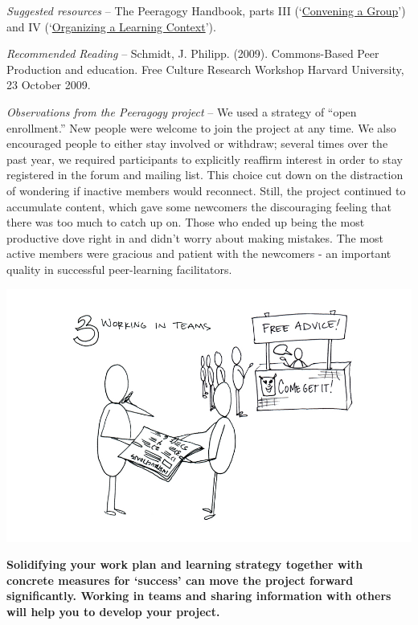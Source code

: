 \emph{Suggested resources} -- The Peeragogy Handbook, parts III
(`\href{http://peeragogy.org/convening-a-group/}{Convening a Group}')
and IV
(`\href{http://peeragogy.org/organizing-a-learning-context/}{Organizing
a Learning Context}').

\emph{Recommended Reading} -- Schmidt, J. Philipp. (2009). Commons-Based
Peer Production and education. Free Culture Research Workshop Harvard
University, 23 October 2009.

\emph{Observations from the Peeragogy project} -- We used a strategy of
``open enrollment.'' New people were welcome to join the project at any
time. We also encouraged people to either stay involved or withdraw;
several times over the past year, we required participants to explicitly
reaffirm interest in order to stay registered in the forum and mailing
list. This choice cut down on the distraction of wondering if inactive
members would reconnect. Still, the project continued to accumulate
content, which gave some newcomers the discouraging feeling that there
was too much to catch up on. Those who ended up being the most
productive dove right in and didn't worry about making mistakes. The
most active members were gracious and patient with the newcomers - an
important quality in successful peer-learning facilitators.

\begin{center}
\includegraphics{../pictures/OpenBook-2-3.jpg}
\end{center}

\textbf{Solidifying your work plan and learning strategy together with
concrete measures for `success' can move the project forward
significantly. Working in teams and sharing information with others will
help you to develop your project.}

